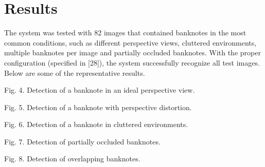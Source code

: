 \section{Results}\label{sec:results}

The system was tested with 82 images that contained banknotes in the most common conditions, such as different perspective views, cluttered environments, multiple banknotes per image and partially occluded banknotes. With the proper configuration (specified in [28]), the system successfully recognize all test images. Below are some of the representative results.

Fig. 4. Detection of a banknote in an ideal perspective view.

Fig. 5. Detection of a banknote with perspective distortion.

Fig. 6. Detection of a banknote in cluttered environments.

Fig. 7. Detection of partially occluded banknotes.

Fig. 8. Detection of overlapping banknotes.
